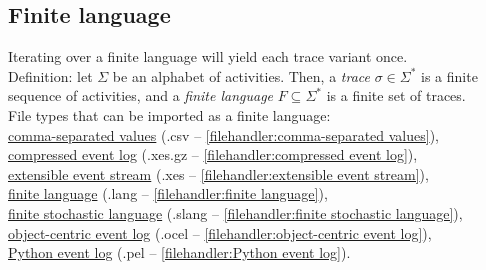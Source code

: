 {\subsection{Finite language}
\label{trait:finite language}
Iterating over a finite language will yield each trace variant once.
            \\
            Definition: let $\Sigma$ be an alphabet of activities.
            Then, a \emph{trace} $\sigma \in \Sigma^*$ is a finite sequence of activities, and 
            a \emph{finite language} $F \subseteq \Sigma^*$ is a finite set of traces.
\\File types that can be imported as a finite language: \\\null\qquad\hyperref[filehandler:comma-separated values]{comma-separated values} (.csv -- \cref{filehandler:comma-separated values}), \\\null\qquad\hyperref[filehandler:compressed event log]{compressed event log} (.xes.gz -- \cref{filehandler:compressed event log}), \\\null\qquad\hyperref[filehandler:extensible event stream]{extensible event stream} (.xes -- \cref{filehandler:extensible event stream}), \\\null\qquad\hyperref[filehandler:finite language]{finite language} (.lang -- \cref{filehandler:finite language}), \\\null\qquad\hyperref[filehandler:finite stochastic language]{finite stochastic language} (.slang -- \cref{filehandler:finite stochastic language}), \\\null\qquad\hyperref[filehandler:object-centric event log]{object-centric event log} (.ocel -- \cref{filehandler:object-centric event log}), \\\null\qquad\hyperref[filehandler:Python event log]{Python event log} (.pel -- \cref{filehandler:Python event log}).
}
